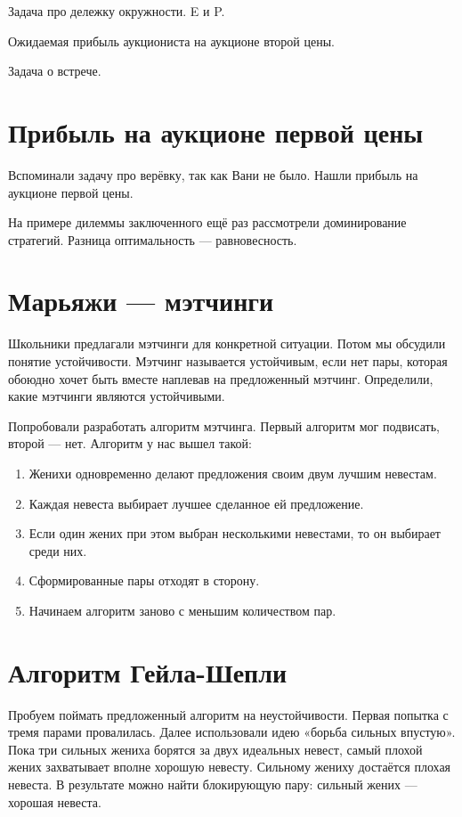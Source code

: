 \documentclass[a4paper, 12pt]{article}
\begin{document}
Задача про дележку окружности. E и P.

Ожидаемая прибыль аукциониста на аукционе второй цены.

Задача о встрече.



\section{Прибыль на аукционе первой цены}

Вспоминали задачу про верёвку, так как Вани не было. Нашли прибыль на аукционе первой цены.

На примере дилеммы заключенного ещё раз рассмотрели доминирование стратегий. Разница оптимальность — равновесность.


\section{Марьяжи — мэтчинги}

Школьники предлагали мэтчинги для конкретной ситуации. Потом мы обсудили понятие устойчивости. Мэтчинг называется устойчивым, если нет пары, которая обоюдно хочет быть вместе наплевав на предложенный мэтчинг. Определили, какие мэтчинги являются устойчивыми.

Попробовали разработать алгоритм мэтчинга. Первый алгоритм мог подвисать, второй — нет. Алгоритм у нас вышел такой:

\begin{enumerate}
\item Женихи одновременно делают предложения своим двум лучшим невестам.
\item Каждая невеста выбирает лучшее сделанное ей предложение.
\item Если один жених при этом выбран несколькими невестами, то он выбирает среди них.
\item Сформированные пары отходят в сторону.
\item Начинаем алгоритм заново с меньшим количеством пар.
\end{enumerate}


\section{Алгоритм Гейла-Шепли}


Пробуем поймать предложенный алгоритм на неустойчивости. Первая попытка с тремя парами провалилась. Далее использовали идею «борьба сильных впустую». Пока три сильных жениха борятся за двух идеальных невест, самый плохой жених захватывает вполне хорошую невесту. Сильному жениху достаётся плохая невеста. В результате можно найти блокирующую пару: сильный жених — хорошая невеста.
\end{document}
